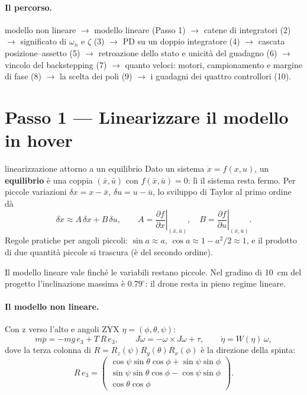 \documentclass[11pt,a4paper]{article}
\begin{document}
\paragraph{Il percorso.}
modello non lineare $\to$ modello lineare (Passo 1) $\to$ catene di integratori (2) $\to$ significato di $\omega_n$ e $\zeta$ (3) $\to$ PD su un doppio integratore (4) $\to$ cascata posizione--assetto (5) $\to$ retroazione dello stato e unicità del guadagno (6) $\to$ vincolo del backstepping (7) $\to$ quanto veloci: motori, campionamento e margine di fase (8) $\to$ la scelta dei poli (9) $\to$ i guadagni dei quattro controllori (10).

\section{Passo 1 --- Linearizzare il modello in hover}

\begin{teoria}{linearizzazione attorno a un equilibrio}
Dato un sistema $\dot x = f(x, u)$, un \textbf{equilibrio} è una coppia $(\bar x, \bar u)$ con $f(\bar x, \bar u) = 0$: lì il sistema resta fermo. Per piccole variazioni $\delta x = x - \bar x$, $\delta u = u - \bar u$, lo sviluppo di Taylor al primo ordine dà
\[
\delta\dot x \approx A\,\delta x + B\,\delta u, \qquad
A = \left.\frac{\partial f}{\partial x}\right|_{(\bar x, \bar u)}, \quad
B = \left.\frac{\partial f}{\partial u}\right|_{(\bar x, \bar u)} .
\]
Regole pratiche per angoli piccoli: $\sin a \approx a$, $\cos a \approx 1 - a^2/2 \approx 1$, e il prodotto di due quantità piccole si trascura (è del secondo ordine).

Il modello lineare vale finché le variabili restano piccole. Nel gradino di 10~cm del progetto l'inclinazione massima è $0.79^\circ$: il drone resta in pieno regime lineare.
\end{teoria}

\paragraph{Il modello non lineare.} Con z verso l'alto e angoli ZYX $\eta = (\phi, \theta, \psi)$:
\[
m\ddot p = -mg\,e_3 + T\,R\,e_3, \qquad J\dot\omega = -\omega \times J\omega + \tau, \qquad \dot\eta = W(\eta)\,\omega ,
\]
dove la terza colonna di $R = R_z(\psi)R_y(\theta)R_x(\phi)$ è la direzione della spinta:
\[
R\,e_3 = \begin{pmatrix} \cos\psi\sin\theta\cos\phi + \sin\psi\sin\phi \\ \sin\psi\sin\theta\cos\phi - \cos\psi\sin\phi \\ \cos\theta\cos\phi \end{pmatrix}.
\]
\end{document}
